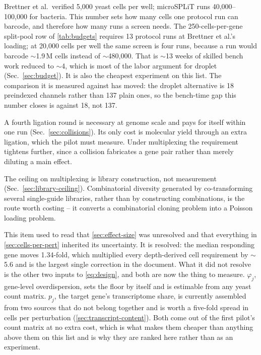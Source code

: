  Brettner et al.\ verified 5{,}000 yeast cells per
well; microSPLiT runs 40{,}000--100{,}000 for bacteria. This number sets how many
cells one protocol run can barcode, and therefore how many runs a screen needs.
The 250-cells-per-gene split-pool row of \cref{tab:budgets} requires 13 protocol
runs at Brettner et al.'s loading; at 20{,}000 cells per well the same screen is
four runs, because a run would barcode $\sim$1.9\,M cells instead of
$\sim$480{,}000. That is $\sim$13 weeks of skilled bench work reduced to
$\sim$4, which is most of the labor argument for droplet
(Sec.~\ref{sec:budget}). It is also the cheapest experiment on this list. The
comparison it is measured against has moved: the droplet alternative is 18
preindexed channels rather than 137 plain ones, so the bench-time gap this
number closes is against 18, not 137.

 A fourth ligation round is necessary at genome scale and
pays for itself within one run (Sec.~\ref{sec:collisions}). Its only cost is
molecular yield through an extra ligation, which the pilot must measure. Under
multiplexing the requirement tightens further, since a collision fabricates a gene
pair rather than merely diluting a main effect.

 The ceiling on multiplexing is library
construction, not measurement (Sec.~\ref{sec:library-ceiling}). Combinatorial
diversity generated by co-transforming several single-guide libraries, rather than
by constructing combinations, is the route worth costing -- it converts a
combinatorial cloning problem into a Poisson loading problem.

 This item
used to read that \cref{sec:effect-size} was unresolved and that everything in
\cref{sec:cells-per-pert} inherited its uncertainty. It is resolved: the median
responding gene moves 1.34-fold, which multiplied every depth-derived cell
requirement by $\sim$5.6 and is the largest single correction in the document.
What it did not resolve is the other two inputs to \cref{eq:design}, and both are
now the thing to measure. $\varphi_j$, gene-level overdispersion, sets the floor
by itself and is estimable from any yeast count matrix. $p_j$, the target gene's
transcriptome share, is currently assembled from two sources that do not belong
together and is worth a five-fold spread in cells per perturbation
(\cref{sec:transcript-content}). Both come out of the first pilot's count matrix
at no extra cost, which is what makes them cheaper than anything above them on
this list and is why they are ranked here rather than as an experiment.

